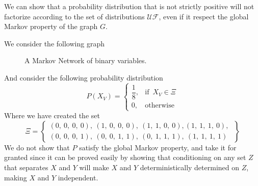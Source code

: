 \documentclass{article}
\numberwithin{equation}{section}
\theoremstyle{named}
\begin{document}
We can show that a probability distribution that is not strictly positive 
will not factorize according to the set of distributions $\mathcal{UF}$, 
even if it respect 
the global Markov property of the graph $G$.

We consider the following graph
\begin{figure}[H]
        \centering
        
        \caption{A Markov Network of binary variables.}
        \label{fig:HCMarkovNetwork}
\end{figure}
And consider the following probability distribution
\[
        P(X_V) = \left\{ 
                \begin{matrix}
                        \dfrac{1}{8},& \text{if }\, X_V \in \Xi \\[3ex]
                        0,& \text{otherwise}

                        
                \end{matrix}
        \right.
\]
Where we have created the set 
\[
        \Xi = \left\{
                \begin{matrix}
                        (0,\ 0,\ 0,\ 0),\ (1,\ 0,\ 0,\ 0),\ (1,\ 1,\ 0,\ 0), 
                        (1,\ 1,\ 1,\ 0),\ \\[2ex] (0,\ 0,\ 0,\ 1),\ 
                        (0,\ 0,\ 1,\ 1),\ (0,\ 1,\ 1,\ 1),\ 
                        (1,\ 1,\ 1,\ 1)
                \end{matrix}
        \right\}
\]
We do not show that $P$ satisfy the global Markov property, and take it for 
granted since it can be proved easily by showing that conditioning on 
any set $Z$ that separates $X$ and $Y$ will make $X$ and $Y$ deterministically 
determined on $Z$, making $X$ and $Y$ independent.
\end{document}
